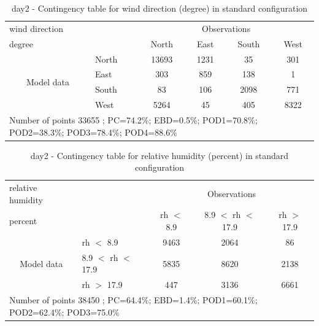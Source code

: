 \begin{table}[p!]
\begin{center}
\begin{tabular}{llcccc}
\hline
{wind direction}                                       &                             &    \multicolumn{4}{c}{Observations}                 \\
{degree}                                       &                             & {North}   & {East} & {South} & {West} \\
\hline
\multicolumn{1}{c}{\multirow{4}{*}{Model data}}  & {North}                    & 13693   & 1231    & 35     & 301\\
                                                 & {East}                     & 303   & 859    & 138     & 1\\
                                                 & {South}                    & 83   & 106   & 2098    & 771\\
                                                 & {West}                     & 5264  & 45   & 405    & 8322\\
\hline 
\multicolumn{6}{l}{ Number of points        33655 ; PC=74.2\%; EBD=0.5\%; POD1=70.8\%; POD2=38.3\%; POD3=78.4\%; POD4=88.6\%}                 \\
\end{tabular}
\end{center}
\caption{day2 - Contingency table for {wind direction} (degree) in standard configuration}
\label{tab:contingencywdBEF:day2}
\end{table}
\begin{table}[p!]
\begin{center}
\begin{tabular}{llccc}
\hline
{relative humidity}                                       &                                                    & \multicolumn{3}{c}{Observations}                 \\
{percent}                                       &                             & rh $<$ 8.9   & 8.9 $<$ rh $<$ 17.9 & rh $>$ 17.9 \\
\hline
\multicolumn{1}{c}{\multirow{3}{*}{Model data}}  & rh $<$ 8.9             & 9463                & 2064                       & 86              \\
                                                 & 8.9  $<$ rh $<$ 17.9 & 5835                & 8620                       & 2138              \\
                                                 & rh $>$ 17.9             & 447                & 3136                       & 6661              \\
\hline
\multicolumn{5}{l}{ Number of points        38450 ; PC=64.4\%; EBD=1.4\%; POD1=60.1\%; POD2=62.4\%; POD3=75.0\%}
\end{tabular}
\end{center}
\caption{day2 - Contingency table for  relative humidity (percent) in standard configuration}
\label{tab:contingencyrhBEF:day2}
\end{table}
